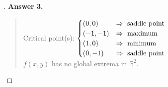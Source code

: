 \documentclass[12pt]{article}
\begin{document}
\begin{proof}[]
	\textbf{Answer 3.} \vspace{-5mm} \\
	\begin{quote}
		Critical point(s): $ \begin{cases}
		(0, 0) & \Rightarrow \textnormal{ saddle point} \\
		(-1, -1) & \Rightarrow \textnormal{ maximum} \\
		(1, 0) & \Rightarrow \textnormal{ minimum} \\
		(0, -1) & \Rightarrow \textnormal{ saddle point}
		\end{cases}	$ \\
		$f(x,y)$ has \underline{no global extrema} in $\mathbb{R}^2$.
	\end{quote}
\end{proof}
\end{document}
